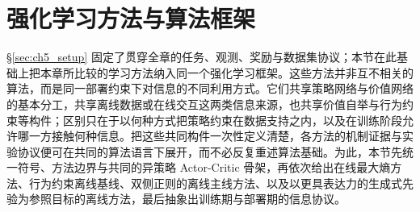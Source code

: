 
\section{强化学习方法与算法框架}\label{sec:ch5_methodology}

\S\ref{sec:ch5_setup} 固定了贯穿全章的任务、观测、奖励与数据集协议；本节在此基础上把本章所比较的学习方法纳入同一个强化学习框架。这些方法并非互不相关的算法，而是同一部署约束下对信息的不同利用方式。它们共享策略网络与价值网络的基本分工，共享离线数据或在线交互这两类信息来源，也共享价值自举与行为约束等构件；区别只在于以何种方式把策略约束在数据支持之内，以及在训练阶段允许哪一方接触何种信息。把这些共同构件一次性定义清楚，各方法的机制证据与实验协议便可在共同的算法语言下展开，而不必反复重述算法基础。为此，本节先统一符号、方法边界与共同的异策略 Actor-Critic 骨架，再依次给出在线最大熵方法、行为约束离线基线、双侧正则的离线主线方法、以及以更具表达力的生成式先验为参照目标的离线方法，最后抽象出训练期与部署期的信息协议。

